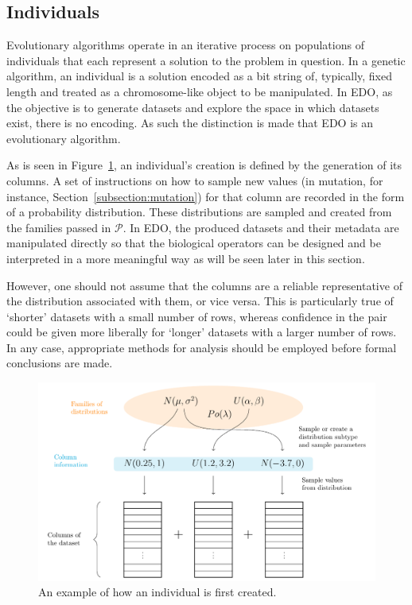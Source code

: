 \documentclass[smallextended]{svjour3}
\newlength{\imgwidth}
\begin{document}
\subsection{Individuals}

Evolutionary algorithms operate in an iterative process on populations of
individuals that each represent a solution to the problem in question. In a
genetic algorithm, an individual is a solution encoded as a bit string of,
typically, fixed length and treated as a chromosome-like object to be
manipulated. In EDO, as the objective is to generate datasets and explore the
space in which datasets exist, there is no encoding. As such the distinction is
made that EDO is an evolutionary algorithm. 

As is seen in Figure~\ref{fig:individual}, an individual's creation is
defined by the generation of its columns. A set of instructions on how to sample
new values (in mutation, for instance, Section~\ref{subsection:mutation}) for
that column are recorded in the form of a probability distribution. These
distributions are sampled and created from the families passed in
\(\mathcal{P}\). In EDO, the produced datasets and their metadata are
manipulated directly so that the biological operators can be designed and be
interpreted in a more meaningful way as will be seen later in this section.

However, one should not assume that the columns are a reliable representative of
the distribution associated with them, or vice versa. This is particularly true
of `shorter' datasets with a small number of rows, whereas confidence in the
pair could be given more liberally for `longer' datasets with a larger number
of rows. In any case, appropriate methods for analysis should be employed before
formal conclusions are made.

\begin{figure}[htbp]
    \centering
    \includegraphics[width=\imgwidth]{Fig3.pdf}
    \caption{%
        An example of how an individual is first created.
    }\label{fig:individual}
\end{figure}
\end{document}
